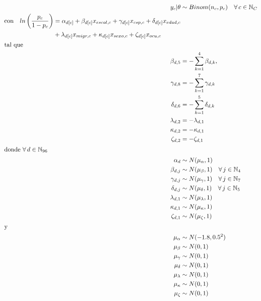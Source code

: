\begin{align}\label{eq:Modelo_Comp_EF}
y_c|\theta & \sim Binom(n_c,p_c) \quad \forall \, c \in \mathbb{N}_C \nonumber \\
\begin{split}
\text{con} \quad ln\left(\dfrac{p_c}{1-p_c}\right) &= \alpha_{d[c]} + \beta_{d[c]} x_{escol,c} + \gamma_{d[c]} x_{csp,c} + \delta_{d[c]} x_{edad,c} \\
&+ \lambda_{d[c]} x_{migr,c} + \kappa_{d[c]} x_{sexo,c} + \zeta_{d[c]} x_{ocu,c} 
\end{split}\\
\intertext{tal que} 
\beta_{d,5} &= -\sum\limits_{k = 1}^{4} \beta_{d,k}, \nonumber \\
\gamma_{d,8} &= -\sum\limits_{k = 1}^{7} \gamma_{d,k} \nonumber \\
\delta_{d,6} &= -\sum\limits_{k = 1}^{5} \delta_{d,k} \nonumber \\
\lambda_{d,2} &= -\lambda_{d,1} \nonumber \\
\kappa_{d,2} &= -\kappa_{d,1} \nonumber \\
\zeta_{d,2} &= -\zeta_{d,1} \nonumber \\
\intertext{donde $\forall \, d \in \mathbb{N}_{96}$}
\alpha_d &\sim N(\mu_{\alpha}, 1) \quad  \nonumber \\
\beta_{d,j} &\sim N(\mu_{\beta}, 1) \quad \forall \, j \in \mathbb{N}_{4} \nonumber \\
\gamma_{d,j} &\sim N(\mu_{\gamma}, 1) \quad \forall \, j \in \mathbb{N}_{7} \nonumber \\
\delta_{d,j} &\sim N(\mu_{\delta}, 1) \quad \forall \, j \in \mathbb{N}_{5}  \nonumber \\ 
\lambda_{d,1} &\sim N(\mu_{\lambda}, 1) \nonumber \\
\kappa_{d,1} &\sim N(\mu_{\kappa}, 1) \nonumber \\ 
\zeta_{d,1} &\sim N(\mu_{\zeta}, 1) \nonumber \\
\intertext{y}
\mu_{\alpha} &\sim N(-1.8,0.5^2) \nonumber \\
\mu_{\beta} &\sim N(0,1) \nonumber \\
\mu_{\gamma} &\sim N(0,1) \nonumber \\
\mu_{\delta} &\sim N(0,1) \nonumber \\
\mu_{\lambda} &\sim N(0,1) \nonumber \\
\mu_{\kappa} &\sim N(0,1) \nonumber \\
\mu_{\zeta} &\sim N(0,1) \nonumber
\end{align}

